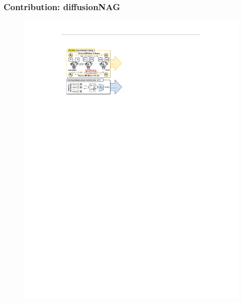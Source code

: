 \documentclass[aspectratio=169,xcolor=dvipsnames]{beamer}
\begin{document}
\begin{frame}
    \frametitle{Contribution: diffusionNAG}
    \begin{figure}[htbp]
        \centering
        \includegraphics[height=.80\textheight]{diffusionNAG_part1.pdf}
    \end{figure}
\end{frame}
\end{document}

